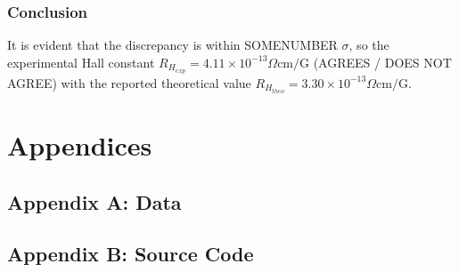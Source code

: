 \documentclass[a4paper]{article}
\begin{document}
\subsubsection{Conclusion}
It is evident that the discrepancy is within SOMENUMBER $\sigma$, so the experimental Hall constant $R_{H_{exp}} = 4.11 \times 10^{-13} \Omega \text{cm/G}$ (AGREES / DOES NOT AGREE) with the reported theoretical value $R_{H_{theo}} = 3.30 \times 10^{-13} \Omega \text{cm/G}$.

\section{Appendices}

\subsection{Appendix A: Data}

\subsection{Appendix B: Source Code}
\end{document}
